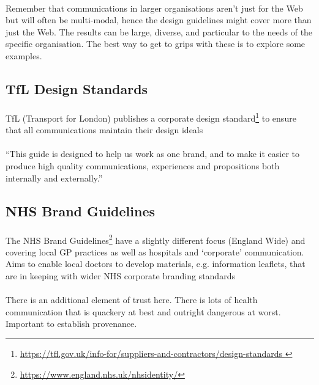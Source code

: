 \paragraph{} Remember that communications in larger organisations aren’t just for the Web but will often be multi-modal, hence the design guidelines might cover more than just the Web. The results can be large, diverse, and particular to the needs of the specific organisation. The best way to get to grips with these is to explore some examples.

\subsection{TfL Design Standards}
\paragraph{} TfL (Transport for London) publishes a corporate design standard\footnote{\url{https://tfl.gov.uk/info-for/suppliers-and-contractors/design-standards
}} to ensure that all communications maintain their design ideals
\paragraph{} ``This guide is designed to help us work as one brand, and to make it easier to produce high quality communications, experiences and propositions both internally and externally.''

\subsection{NHS Brand Guidelines}
\paragraph{} The NHS Brand Guidelines\footnote{\url{https://www.england.nhs.uk/nhsidentity/}} have a slightly different focus (England Wide) and covering local GP practices as well as hospitals and `corporate' communication. Aims to enable local doctors to develop materials, e.g. information leaflets, that are in keeping with wider NHS corporate branding standards
\paragraph{} There is an additional element of trust here. There is lots of health communication that is quackery at best and outright dangerous at worst. Important to establish provenance.

